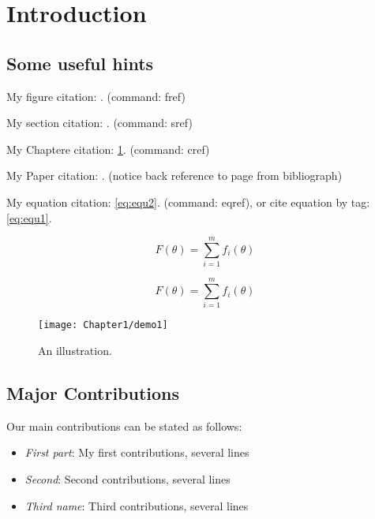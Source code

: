 
\chapter{Introduction} %
\label{ch:introduction} %
\setlength{\parindent}{4ex}


\section{Some useful hints}

My figure citation: . (command: fref)

My section citation: . (command: sref)

My Chaptere citation: \cref{ch:introduction}. (command: cref)

My Paper citation: \cite{bardeen1957theory}. (notice back reference to page from bibliograph)

My equation citation: \eqref{eq:equ2}. (command: eqref), or cite equation by tag: \eqref{eq:equ1}.

\begin{equation}\label{eq:equ1}
F(\theta)=\sum_{i=1}^mf_i(\theta) \tag{DOP}
\end{equation}

\begin{equation}\label{eq:equ2}
F(\theta)=\sum_{i=1}^mf_i(\theta)
\end{equation}

\begin{figure}[htbp]
  \centering
    \texttt{[image: Chapter1/demo1]}
  \caption{An illustration.}
  \label{fig:demo1}
\end{figure}



\section{Major Contributions}\label{sec:contribution}
Our main contributions can be stated as follows:
\begin{itemize}
\item \emph{First part}: My first contributions, several lines


\item \emph{Second}: Second contributions, several lines


\item \emph{Third name}: 
Third contributions, several lines

\end{itemize}

